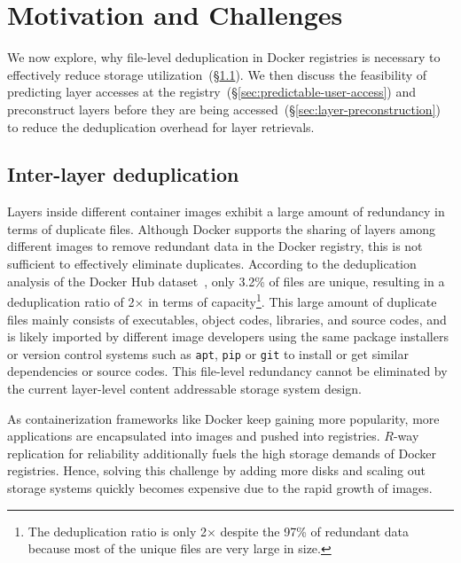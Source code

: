\section{Motivation and Challenges}
\label{sec:dataset-analysis}

We now explore, why file-level deduplication in Docker registries is necessary to
effectively reduce storage utilization~(\S\ref{sec:inter-layer-deduplication}).
We then discuss the feasibility of predicting layer accesses at the
registry~(\S\ref{sec:predictable-user-access}) and preconstruct layers before they
are being accessed~(\S\ref{sec:layer-preconstruction}) to reduce the deduplication
overhead for layer retrievals.

\subsection{Inter-layer deduplication}
\label{sec:inter-layer-deduplication}

Layers inside different container images exhibit a large amount of redundancy
in terms of duplicate files.
%
Although Docker
supports the sharing of layers among different images to remove redundant data in the
Docker registry,
this is not sufficient to effectively eliminate duplicates.
%
According to the deduplication analysis of the Docker Hub
dataset~\cite{dedupanalysis}, only 3.2\% of files are unique, resulting in
a deduplication ratio of 2$\times$ in terms of
capacity\footnote{The deduplication ratio is only 2$\times$ despite the 97\% of redundant data
because most of the unique files are very large in size.}.
%
This large amount of duplicate files
mainly consists of executables, object codes, libraries, and
source codes, and is likely imported by different image developers using the same
package installers or version control systems such as \texttt{apt},
\texttt{pip} or \texttt{git} to install or get similar dependencies or source
codes.  
%
This file-level redundancy cannot be eliminated by the current layer-level content addressable
storage system design.

As containerization frameworks like Docker keep gaining more
popularity, more applications are encapsulated into images and pushed into
registries.
%
$R$-way replication for reliability additionally fuels the high storage demands
of Docker registries.
%
Hence, solving this challenge by adding more disks and scaling out storage systems
quickly becomes expensive due to the rapid growth of images.
 
